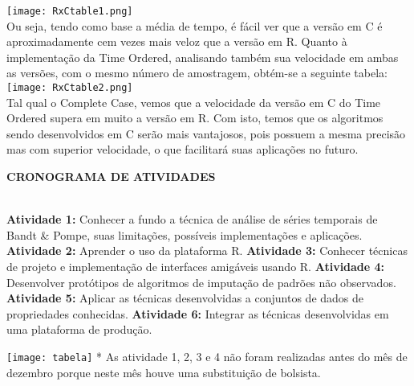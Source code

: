 \documentclass{article}
\begin{document}
\texttt{[image: RxCtable1.png]}\\

Ou seja, tendo como base a média de tempo, é fácil ver que a versão em C é aproximadamente cem vezes mais veloz que a versão em R.
Quanto à implementação da Time Ordered, analisando também sua velocidade em ambas as versões, com o mesmo número de amostragem, obtém-se a seguinte tabela:\\

\texttt{[image: RxCtable2.png]}\\

Tal qual o Complete Case, vemos que a velocidade da versão em C do Time Ordered supera em muito a versão em R.
Com isto, temos que os algoritmos sendo desenvolvidos em C serão mais vantajosos, pois possuem a mesma precisão mas com superior velocidade, o que facilitará suas aplicações no futuro.\\

\newpage
\begin{center}
\textbf{\large{CRONOGRAMA DE ATIVIDADES}}\\
\hrulefill \\
\end{center}

\begin{flushleft}    
\textbf{Atividade 1:} Conhecer a fundo a técnica de análise de séries temporais de Bandt & Pompe, suas limitações, possíveis implementações e aplicações.
\newline
\textbf{Atividade 2:} Aprender o uso da plataforma R.
\newline
\textbf{Atividade 3:} Conhecer técnicas de projeto e implementação de interfaces amigáveis usando R.
\newline
\textbf{Atividade 4:} Desenvolver protótipos de algoritmos de imputação de padrões não observados.
\newline
\textbf{Atividade 5:} Aplicar as técnicas desenvolvidas a conjuntos de dados de propriedades conhecidas.
\newline
\textbf{Atividade 6:} Integrar as técnicas desenvolvidas em uma plataforma de produção.
\end{flushleft}
\texttt{[image: tabela]}
* As atividade 1, 2, 3 e 4 não foram realizadas antes do mês de dezembro porque neste mês houve uma substituição de bolsista.
\end{document}
